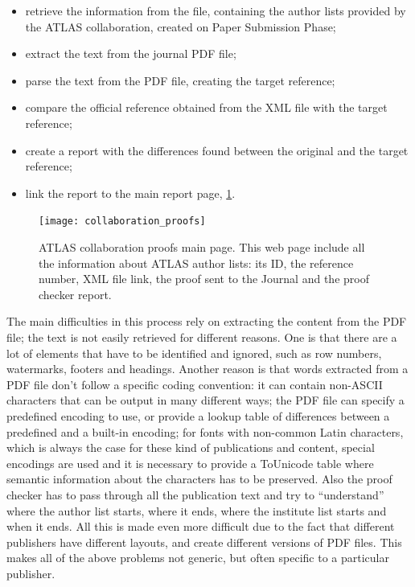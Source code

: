 \begin{itemize}
\item retrieve the information from the  file, containing the author lists provided by the ATLAS collaboration,  created on Paper Submission Phase;
\item extract the text from the journal PDF file;
\item parse the text from the PDF file, creating the target reference;
\item compare the official reference obtained from the XML file with the target reference;
\item create a report with the differences found between the original and the target reference;
\item link the report to the main report page, \cref{fig:collaboration_proofs}.
\end{itemize}

\begin{figure}[htb]
  \centering
  \texttt{[image: collaboration\_proofs]}
  \caption{ATLAS collaboration proofs main page. This web page include all the information about ATLAS author lists: its ID, the reference number, XML file link, the proof sent to the Journal and the proof checker report.}
  \label{fig:collaboration_proofs}
\end{figure}

The main difficulties in this process rely on extracting the content from the PDF file; the text is not easily retrieved for different reasons.
One is that there are a lot of elements that have to be identified and ignored, such as row numbers, watermarks, footers and headings.
Another reason is that words extracted from a PDF file don't follow a specific coding convention:
it can contain non-ASCII characters that can be output in many different ways;
the PDF file can specify a predefined encoding to use, or provide a lookup table of differences between a predefined and a built-in encoding;
for fonts with non-common Latin characters, which is always the case for these kind of publications and content,
special encodings are used and it is necessary to provide a ToUnicode table where semantic information about the characters has to be preserved.
Also the proof checker has to pass through all the publication text and try to \enquote{understand} where the author list starts, where it ends, where the institute list starts and when it ends.
All this is made even more difficult due to the fact that different publishers have different layouts, and create different versions of PDF files.
This makes all of the above problems not generic,
but often specific to a particular publisher.

